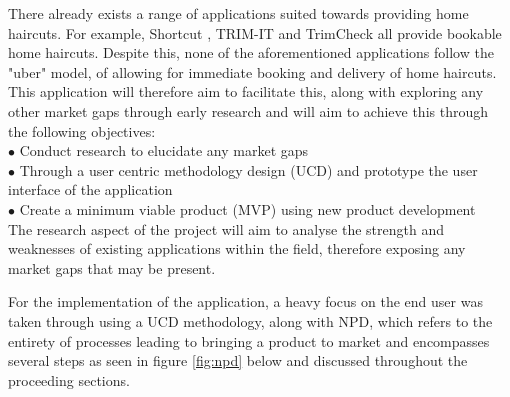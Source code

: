 \documentclass[12pt]{article}
\begin{document}
	There already exists a range of applications suited towards providing home haircuts. For example, Shortcut \cite{incShortcutInHomeHaircuts}, TRIM-IT\cite{TRIMITMobileBarbershopsa} and TrimCheck\cite{TrimCheckHomeHaircuts} all provide bookable home haircuts. Despite this, none of the aforementioned applications follow the "uber" model, of allowing for immediate booking and delivery of home haircuts. 
	\\
	
	This application will therefore aim to facilitate this, along with exploring any other market gaps through early research and will aim to achieve this through the following objectives:
	\\
	
	\noindent
	$\bullet$ Conduct research to elucidate any market gaps
	\\
	$\bullet$ Through a user centric methodology design (UCD) and prototype the user interface of the application
	\\
	$\bullet$ Create a minimum viable product (MVP) using new product development
	\\
	
	The research aspect of the project will aim to analyse the strength and weaknesses of existing applications within the field, therefore exposing any market gaps that may be present. 
	
	For the implementation of the application, a heavy focus on the end user was taken through using a UCD methodology, along with NPD, which refers to the  entirety of processes leading to bringing a product to market and encompasses several steps as seen in figure \ref{fig:npd} below and discussed throughout the proceeding sections.
	\newline
	
\end{document}
